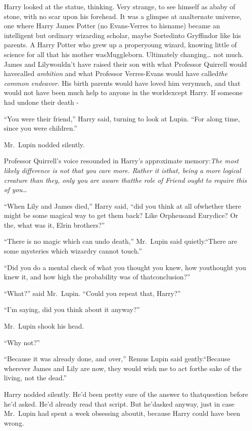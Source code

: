 Harry looked at the statue, thinking. Very strange, to see himself as ababy of stone, with no scar upon his forehead. It was a glimpse at analternate universe, one where Harry James Potter (no Evans-Verres to hisname) became an intelligent but ordinary wizarding scholar, maybe Sortedinto Gryffindor like his parents. A Harry Potter who grew up a properyoung wizard, knowing little of science for all that his mother wasMuggleborn. Ultimately changing\ldots{} not much. James and Lilywouldn't have raised their son with what Professor Quirrell would havecalled \emph{ambition} and what Professor Verres-Evans would have called\emph{the common endeavor.} His birth parents would have loved him verymuch, and that would not have been much help to anyone in the worldexcept Harry. If someone had undone their death -

``You were their friend,'' Harry said, turning to look at Lupin. ``For along time, since you were children.''

Mr.~Lupin nodded silently.

Professor Quirrell's voice resounded in Harry's approximate memory:\emph{The most likely difference is not that you care more. Rather it isthat, being a more logical creature than they, only you are aware thatthe role of Friend ought to require this of you\ldots{}}

``When Lily and James died,'' Harry said, ``did you think at all ofwhether there might be some magical way to get them back? Like Orpheusand Eurydice? Or the, what was it, Elrin brothers?''

``There is no magic which can undo death,'' Mr.~Lupin said quietly.``There are some mysteries which wizardry cannot touch.''

``Did you do a mental check of what you thought you knew, how youthought you knew it, and how high the probability was of thatconclusion?''

``What?'' said Mr.~Lupin. ``Could you repeat that, Harry?''

``I'm saying, did you think about it anyway?''

Mr.~Lupin shook his head.

``Why not?''

``Because it was already done, and over,'' Remus Lupin said gently.``Because wherever James and Lily are now, they would wish me to act forthe sake of the living, not the dead.''

Harry nodded silently. He'd been pretty sure of the answer to thatquestion before he'd asked. He'd already read that script. But he'dasked anyway, just in case Mr.~Lupin had spent a week obsessing aboutit, because Harry could have been wrong.

